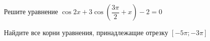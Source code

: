 \begin{ex}
	\begin{condition}
		\begin{enumcols}[label=\asbuk*)]
			\item Решите уравнение \( \cos 2x + 3\cos {\left(\dfrac{3\pi}{2}+x\right)} - 2 = 0 \)
			\item Найдите все корни уравнения, принадлежащие отрезку \( \left[-5\pi;-3\pi\right] \)
		\end{enumcols}
	\end{condition}
\end{ex}